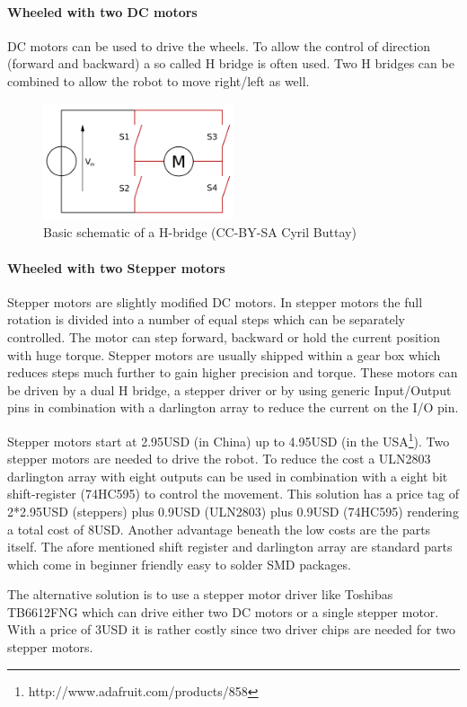 \documentclass[11pt,a4paper]{article}
\begin{document}
\paragraph{Wheeled with two DC motors}
DC motors can be used to drive the wheels. To allow the control of direction (forward and backward) a so called H bridge is often used. Two H bridges can be combined to allow the robot to move right/left as well. 
\begin{figure}[h!]
  \centering
  \includegraphics[width=0.5\textwidth]{images/hbridge.png}
  \caption{Basic schematic of a H-bridge (CC-BY-SA Cyril Buttay)}
\end{figure}
\paragraph{Wheeled with two Stepper motors}
Stepper motors are slightly modified DC motors. In stepper motors the full rotation is divided into a number of equal steps which can be separately controlled. The motor can step forward, backward or hold the current position with huge torque. Stepper motors are usually shipped within a gear box which reduces steps much further to gain higher precision and torque. 
These motors can be driven by a dual H bridge, a stepper driver or by using generic Input/Output pins in combination with a darlington array to reduce the current on the I/O pin. 

Stepper motors start at 2.95USD (in China) up to 4.95USD (in the USA\footnote{http://www.adafruit.com/products/858}). Two stepper motors are needed to drive the robot. To reduce the cost a ULN2803 darlington array with eight outputs can be used in combination with a eight bit shift-register (74HC595) to control the movement. This solution has a price tag of 2*2.95USD (steppers) plus 0.9USD (ULN2803) plus 0.9USD (74HC595) rendering a total cost of 8USD. Another advantage beneath the low costs are the parts itself. The afore mentioned shift register and darlington array are standard parts which come in beginner friendly easy to solder SMD packages. 

The alternative solution is to use a stepper motor driver like Toshibas TB6612FNG which can drive either two DC motors or a single stepper motor. With a price of 3USD it is rather costly since two driver chips are needed for two stepper motors.
\end{document}

